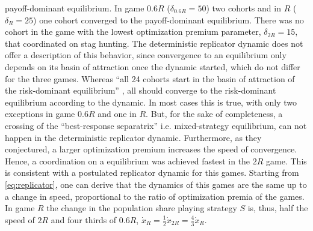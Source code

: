 payoff-dominant equilibrium. 
In game $0.6R$ ($\delta_{0.6R}=50$) two cohorts and in $R$ ($\delta_{R}=25$)
one cohort converged to the payoff-dominant equilibrium. There was no
cohort in the game with the lowest optimization premium parameter, 
$\delta_{2R}= 15$, that coordinated on stag hunting.
The deterministic replicator dynamic does 
not offer a description of this behavior, since convergence to an 
equilibrium only depends on its basin of attraction once the dynamic 
started, which do not differ for the three games. 
Whereas ``all 24 cohorts start in the basin of attraction
of the risk-dominant equilibrium'' 
\parencite[755]{battalio_optimization_2001}, all should converge to the 
risk-dominant equilibrium according to the dynamic.
In most cases this is true, with only two exceptions in game $0.6R$ 
and one in $R$.
But, for the sake of completeness, a crossing of the  
``best-response separatrix'' \parencite{battalio_optimization_2001} i.e. 
mixed-strategy equilibrium, can not happen in the deterministic replicator 
dynamic. Furthermore, as they conjectured, a larger optimization premium 
increases the speed of convergence. Hence, a coordination on a equilibrium 
was achieved fastest in the $2R$ game. This is consistent with a 
postulated replicator dynamic for this games. Starting from 
\eqref{eq:replicator}, one can derive that the dynamics of this 
games are the same up to a change in speed, proportional to the ratio of 
optimization premia of the games. In game $R$ the change in the population share
playing strategy $S$ is, thus, half the speed of $2R$ and four thirds of $0.6R$,
$\dot{x}_{R} = \frac 12 \dot{x}_{2R} = \frac{4}{3}\dot{x}_R$.

